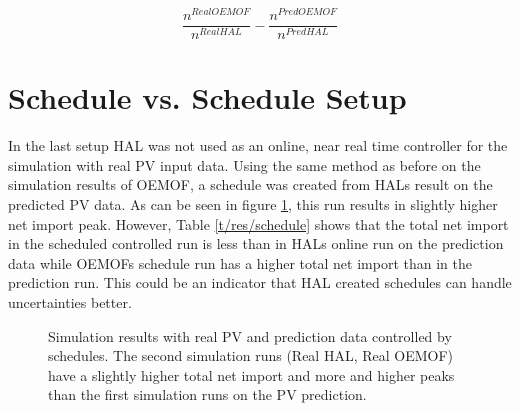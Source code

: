 \documentclass[a4paper,12pt]{book}
\theoremstyle{break}
\begin{document}
\begin{equation}\label{e/res/ratio}
\frac{n^{Real OEMOF}}{n^{Real HAL}} - \frac{n^{Pred OEMOF}}{n^{Pred HAL}}
\end{equation}

\section{Schedule vs. Schedule Setup}
In the last setup HAL was not used as an online, near real time controller for the simulation with real \ac{PV} input data. Using the same method as before on the simulation results of \ac{OEMOF}, a schedule was created from HALs result on the predicted \ac{PV} data. As can be seen in figure \ref{f/res/svss/total}, this run results in slightly higher net import peak. However, Table \ref{t/res/schedule} shows that the total net import in the scheduled controlled run is less than in HALs online run on the prediction data while \ac{OEMOF}s schedule run has a higher total net import than in the prediction run. This could be an indicator that HAL created schedules can handle uncertainties better.
\begin{figure}[ht]
	\centering
	\caption{Simulation results with real PV and prediction data controlled by schedules. The second simulation runs (Real HAL, Real OEMOF) have a slightly higher total net import and more and higher peaks than the first simulation runs on the \ac{PV} prediction. }%
	\label{f/res/svss/total}%
\end{figure}
\end{document}
